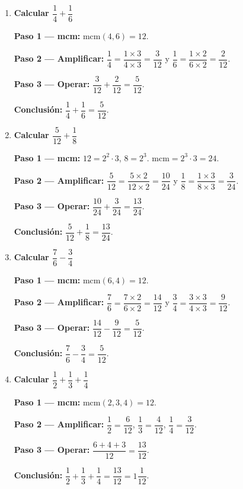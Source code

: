 \documentclass[11pt, letterpaper]{article}
\begin{document}
\begin{tcolorbox}[examplebox, title={Ejemplos --- suma y resta con amplificaci\'on}]
\begin{enumerate}[label=\textbf{Ej. \arabic*.}, leftmargin=*, itemsep=14pt]

\item \textbf{Calcular $\dfrac{1}{4} + \dfrac{1}{6}$}

\textbf{Paso 1 --- mcm:} $\text{mcm}(4,6) = 12$.

\textbf{Paso 2 --- Amplificar:} $\dfrac{1}{4} = \dfrac{1\times3}{4\times3} = \dfrac{3}{12}$ \quad y \quad $\dfrac{1}{6} = \dfrac{1\times2}{6\times2} = \dfrac{2}{12}$.

\textbf{Paso 3 --- Operar:} $\dfrac{3}{12} + \dfrac{2}{12} = \dfrac{5}{12}$.

\textbf{Conclusi\'on:} $\dfrac{1}{4} + \dfrac{1}{6} = \dfrac{5}{12}$. \checkmark

\item \textbf{Calcular $\dfrac{5}{12} + \dfrac{1}{8}$}

\textbf{Paso 1 --- mcm:} $12 = 2^2\cdot3$, $8 = 2^3$. $\text{mcm} = 2^3\cdot3 = 24$.

\textbf{Paso 2 --- Amplificar:} $\dfrac{5}{12} = \dfrac{5\times2}{12\times2} = \dfrac{10}{24}$ \quad y \quad $\dfrac{1}{8} = \dfrac{1\times3}{8\times3} = \dfrac{3}{24}$.

\textbf{Paso 3 --- Operar:} $\dfrac{10}{24} + \dfrac{3}{24} = \dfrac{13}{24}$.

\textbf{Conclusi\'on:} $\dfrac{5}{12} + \dfrac{1}{8} = \dfrac{13}{24}$. \checkmark

\item \textbf{Calcular $\dfrac{7}{6} - \dfrac{3}{4}$}

\textbf{Paso 1 --- mcm:} $\text{mcm}(6,4) = 12$.

\textbf{Paso 2 --- Amplificar:} $\dfrac{7}{6} = \dfrac{7\times2}{6\times2} = \dfrac{14}{12}$ \quad y \quad $\dfrac{3}{4} = \dfrac{3\times3}{4\times3} = \dfrac{9}{12}$.

\textbf{Paso 3 --- Operar:} $\dfrac{14}{12} - \dfrac{9}{12} = \dfrac{5}{12}$.

\textbf{Conclusi\'on:} $\dfrac{7}{6} - \dfrac{3}{4} = \dfrac{5}{12}$. \checkmark

\item \textbf{Calcular $\dfrac{1}{2} + \dfrac{1}{3} + \dfrac{1}{4}$}

\textbf{Paso 1 --- mcm:} $\text{mcm}(2,3,4) = 12$.

\textbf{Paso 2 --- Amplificar:} $\dfrac{1}{2}=\dfrac{6}{12}$, \quad $\dfrac{1}{3}=\dfrac{4}{12}$, \quad $\dfrac{1}{4}=\dfrac{3}{12}$.

\textbf{Paso 3 --- Operar:} $\dfrac{6+4+3}{12} = \dfrac{13}{12}$.

\textbf{Conclusi\'on:} $\dfrac{1}{2}+\dfrac{1}{3}+\dfrac{1}{4} = \dfrac{13}{12} = 1\dfrac{1}{12}$. \checkmark

\end{enumerate}
\end{tcolorbox}
\end{document}
